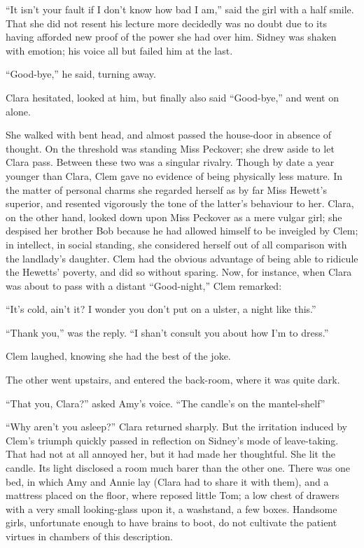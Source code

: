 ``It isn't your fault if I don't know how bad I am,'' said the girl with
a half smile. {\protect\hypertarget{79}{}{}}That she did not resent his
lecture more decidedly was no doubt due to its having afforded new proof
of the power she had over him. Sidney was shaken with emotion; his voice
all but failed him at the last.

``Good-bye,'' he said, turning away.

Clara hesitated, looked at him, but finally also said ``Good-bye,'' and
went on alone.

She walked with bent head, and almost passed the house-door in absence
of thought. On the threshold was standing Miss Peckover; she drew aside
to let Clara pass. Between these two was a singular rivalry. Though by
date a year younger than Clara, Clem gave no evidence of being
physically less mature. In the matter of personal charms she regarded
herself as by far Miss Hewett's superior, and resented vigorously the
tone of the latter's behaviour to her. Clara, on the other hand, looked
down upon Miss Peckover as a mere vulgar girl; she despised her brother
Bob because he had allowed himself to be inveigled by Clem; in
intellect, in social standing, she considered
{\protect\hypertarget{80}{}{}}herself out of all comparison with the
landlady's daughter. Clem had the obvious advantage of being able to
ridicule the Hewetts' poverty, and did so without sparing. Now, for
instance, when Clara was about to pass with a distant ``Good-night,''
Clem remarked:

``It's cold, ain't it? I wonder you don't put on a ulster, a night like
this.''

``Thank you,'' was the reply. ``I shan't consult you about how I'm to
dress.''

Clem laughed, knowing she had the best of the joke.

The other went upstairs, and entered the back-room, where it was quite
dark.

``That you, Clara?'' asked Amy's voice. ``The candle's on the
mantel-shelf''

``Why aren't you asleep?'' Clara returned sharply. But the irritation
induced by Clem's triumph quickly passed in reflection on Sidney's mode
of leave-taking. That had not at all annoyed her, but it had made her
thoughtful. She lit the candle. Its light disclosed a room much barer
than the other one. There was one bed, in which Amy and Annie
{\protect\hypertarget{81}{}{}}lay (Clara had to share it with them), and
a mattress placed on the floor, where reposed little Tom; a low chest of
drawers with a very small looking-glass upon it, a washstand, a few
boxes. Handsome girls, unfortunate enough to have brains to boot, do not
cultivate the patient virtues in chambers of this description.

